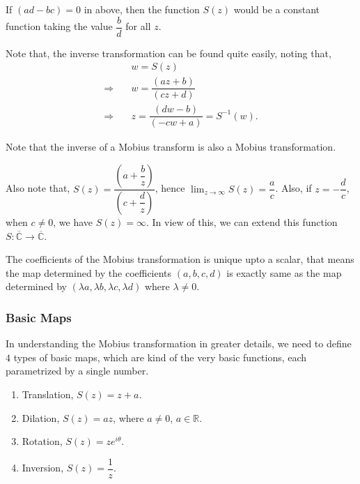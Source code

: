 \documentclass[12pt]{article}
\newcommand{\R}{\mathbb{R}}
\newcommand{\C}{\mathbb{C}}
\newcommand{\Cinf}{\overline{\C}}
\theoremstyle{definition}
\newenvironment{note}{
\begin{tcolorbox}[colback=blue!5!white,colframe=blue!75!black,title=Note, parbox = false] }{\end{tcolorbox} }
\begin{document}
\begin{note}
    If $(ad-bc)=0$ in above, then the function $S(z)$ would be a constant function taking the value $\dfrac{b}{d}$ for all $z$. 
\end{note}

Note that, the inverse transformation can be found quite easily, noting that, 
\begin{align*}
    & \quad w = S(z) \\
    \Rightarrow & \quad w = \dfrac{(az + b)}{(cz + d)}\\
    \Rightarrow & \quad z = \dfrac{(dw - b)}{(-cw + a)} = S^{-1}(w).
\end{align*}
\begin{note}
    Note that the inverse of a Mobius transform is also a Mobius transformation.
\end{note}

Also note that, $S(z) = \dfrac{\left( a+ \dfrac{b}{z} \right)}{\left( c+ \dfrac{d}{z} \right)}$, hence $\lim_{z\rightarrow \infty}S(z) = \dfrac{a}{c}$. Also, if $z = -\dfrac{d}{c}$, when $c\neq 0$, we have $S(z) = \infty$. In view of this, we can extend this function $S : \Cinf \rightarrow \Cinf$.

The coefficients of the Mobius transformation is unique upto a scalar, that means the map determined by the coefficients $(a, b, c, d)$ is exactly same as the map determined by $(\lambda a, \lambda b, \lambda c, \lambda d)$ where $\lambda \neq 0$. 
\subsubsection{Basic Maps}

In understanding the Mobius transformation in greater details, we need to define $4$ types of basic maps, which are kind of the very basic functions, each parametrized by a single number. 

\begin{enumerate}
    \item Translation, $S(z) = z + a$.
    \item Dilation, $S(z) = a z$, where $a\neq 0$, $a \in \R$.
    \item Rotation, $S(z) = z e^{i\theta}$.
    \item Inversion, $S(z) = \dfrac{1}{z}$.
\end{enumerate}
\end{document}
